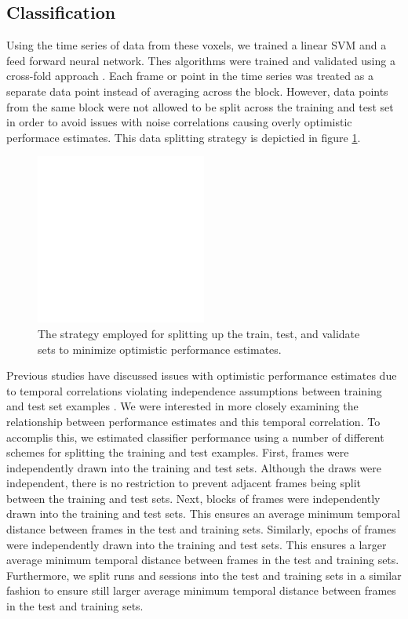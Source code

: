 \documentclass[twocolumn,final]{article}
\begin{document}
\subsection{Classification}
Using the time series of data from these voxels, we trained a linear SVM and a feed forward neural network.
Thes algorithms were trained and validated using a cross-fold approach \cite{Kohavi1995}.
Each frame or point in the time series was treated as a separate data point instead of averaging across the block.
However, data points from the same block were not allowed to be split across the training and test set in order to avoid issues with noise correlations causing overly optimistic performace estimates.
This data splitting strategy is depictied in figure \ref{fig:data-split}.

\begin{figure}[!htbp]
\centering
\includegraphics[width=0.5\textwidth]{figures/placeholder}
\caption{The strategy employed for splitting up the train, test, and validate sets to minimize optimistic performance estimates.}
\label{fig:data-split}
\end{figure}

Previous studies have discussed issues with optimistic performance estimates due to temporal correlations violating independence assumptions between training and test set examples \cite{Pereira2009}.
We were interested in more closely examining the relationship between performance estimates and this temporal correlation.
To accomplis this, we estimated classifier performance using a number of different schemes for splitting the training and test examples.
First, frames were independently drawn into the training and test sets.
Although the draws were independent, there is no restriction to prevent adjacent frames being split between the training and test sets.
Next, blocks of frames were independently drawn into the training and test sets.
This ensures an average minimum temporal distance between frames in the test and training sets.
Similarly, epochs of frames were independently drawn into the training and test sets.
This ensures a larger average minimum temporal distance between frames in the test and training sets.
Furthermore, we split runs and sessions into the test and training sets in a similar fashion to ensure still larger average minimum temporal distance between frames in the test and training sets.
\end{document}
